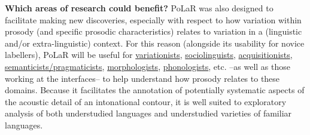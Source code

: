 \textbf{Which areas of research could benefit?} PoLaR was also designed to facilitate making new discoveries, especially with respect to how variation within prosody (and specific prosodic characteristics) relates to variation in a (linguistic and/or extra-linguistic) context. For this reason (alongside its usability for novice labellers), PoLaR will be useful for \uline{variationists}, \uline{sociolinguists}, \uline{acquisitionists}, \uline{semanticists\slash pragmaticists}, \uline{morphologists}, \uline{phonologists}, etc. --as well as those working at the interfaces-- to help understand how prosody relates to these domains. Because it facilitates the annotation of potentially systematic aspects of the acoustic detail of an intonational contour, it is well suited to exploratory analysis of both understudied languages and understudied varieties of familiar languages.


